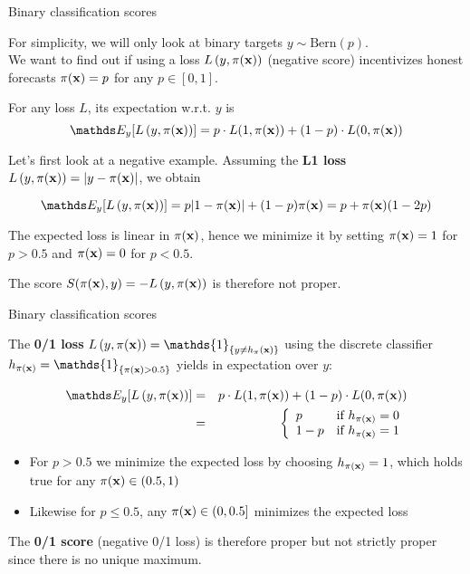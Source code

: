 \documentclass[11pt,compress,t,notes=noshow, xcolor=table]{beamer}
\begin{document}
\begin{vbframe}{Binary classification scores}

For simplicity, we will only look at binary targets $y \sim \text{Bern}(p)$.\\ %
We want to find out if using a loss $L\left(y, \pi(\mathbf{x})\right)$ (negative score) incentivizes honest forecasts $\pi(\mathbf{x})=p$ for any $p \in [0,1]$.

\lz

For any loss $L$, its expectation w.r.t. $y$ is
$$\E_{y}[\Lpixy]=p \cdot L(1, \pix) + (1-p) \cdot L(0, \pix)$$

\vspace{0.2cm}

Let's first look at a negative example. Assuming the \textbf{L1 loss} $L\left(y, \pi(\mathbf{x})\right)=|y-\pi(\mathbf{x})|$, we obtain

$$\E_y[\Lpixy]=p |1-\pix| + (1-p) \pix = p+\pix(1-2p)$$

\vspace{0.2cm}

The expected loss is linear in $\pi(\mathbf{x})$, hence we minimize it by setting $\pi(\mathbf{x}) = 1$ for $p>0.5$ and $\pi(\mathbf{x}) = 0$ for $p<0.5$. 

\vspace{0.2cm}

The score $S(\pi(\mathbf{x}),y)=-L\left(y, \pi(\mathbf{x})\right)$ is therefore not proper.

\end{vbframe}

\begin{vbframe}{Binary classification scores}

The \textbf{0/1 loss} $\Lpixy=\mathds{1}_{\{y \neq h_\pix\}}$ using the discrete classifier $h_{\pix}=\mathds{1}_{\{\pix>0.5\}}$ yields in expectation over $y$:

\begin{eqnarray*}
\E_y[\Lpixy] &=& p \cdot L(1,\pix) + (1-p) \cdot L(0,\pix)\\
&=& \left\{
\begin{array}{ll}
p & \text{if } h_{\pix} = 0 \\
1-p & \text{if } h_{\pix} = 1
\end{array}
\right.
\end{eqnarray*}

\begin{itemize}
    \item For $p>0.5$ we minimize the expected loss by choosing $h_{\pi(\mathbf{x})}=1$, which holds true for any $\pi(\mathbf{x}) \in (0.5,1)$
    \item Likewise for $p\leq 0.5$, any $\pi(\mathbf{x}) \in (0, 0.5]$ minimizes the expected loss
\end{itemize}

\lz

The \textbf{0/1 score} (negative 0/1 loss) is therefore proper but not strictly proper since there is no unique maximum.

\end{vbframe}
\end{document}
